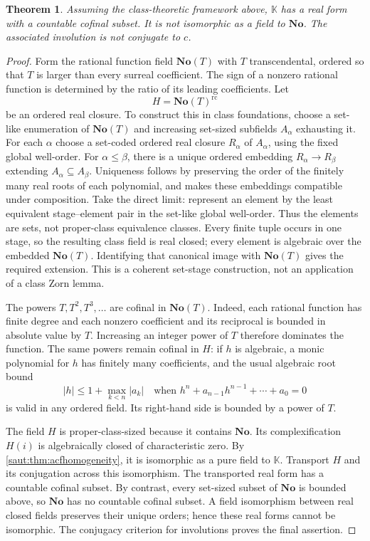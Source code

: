 \documentclass[11pt]{article}
\newtheorem{theorem}{Theorem}[section]
\theoremstyle{definition}
\theoremstyle{remark}
\newcommand{\No}{\mathbf{No}}
\newcommand{\K}{\mathbb K}
\newcommand{\rc}{\operatorname{rc}}
\numberwithin{equation}{section}
\begin{document}
\begin{theorem}\label{saut:thm:inequivalentrealform}
Assuming the class-theoretic framework above, $\K$ has a real form with a
countable cofinal subset. It is not isomorphic as a field to $\No$.
The associated involution is not conjugate to $c$.
\end{theorem}
\begin{proof}
Form the rational function field $\No(T)$ with $T$ transcendental, ordered
so that $T$ is larger than every surreal coefficient. The sign of a
nonzero rational function is determined by the ratio of its leading
coefficients. Let
\[
 H=\No(T)^{\rc}
\]
be an ordered real closure. To construct this in class foundations,
choose a set-like enumeration of $\No(T)$ and increasing set-sized subfields
$A_\alpha$ exhausting it. For each $\alpha$ choose a set-coded ordered real
closure $R_\alpha$ of $A_\alpha$, using the fixed global well-order.
For $\alpha\le\beta$, there is a unique ordered embedding
$R_\alpha\to R_\beta$ extending $A_\alpha\subseteq A_\beta$.
Uniqueness follows by preserving the order of the finitely many real roots
of each polynomial, and makes these embeddings compatible under composition.
Take the direct limit: represent an element by the least equivalent
stage--element pair in the set-like global well-order. Thus the elements
are sets, not proper-class equivalence classes. Every finite tuple occurs
in one stage, so the resulting class field is real closed; every element
is algebraic over the embedded $\No(T)$. Identifying that canonical image
with $\No(T)$ gives the required extension. This is a coherent set-stage
construction, not an application of a class Zorn lemma.

The powers $T,T^2,T^3,\ldots$ are cofinal in $\No(T)$. Indeed, each rational
function has finite degree and each nonzero coefficient and its reciprocal
is bounded in absolute value by $T$. Increasing an integer power of $T$
therefore dominates the function. The same powers remain cofinal in $H$:
if $h$ is algebraic, a monic polynomial for $h$ has finitely many
coefficients, and the usual algebraic root bound
\[
 |h|\le 1+\max_{k<n}|a_k|
 \quad\text{when }h^n+a_{n-1}h^{n-1}+\cdots+a_0=0
\]
is valid in any ordered field. Its right-hand side is bounded by a power
of $T$.

The field $H$ is proper-class-sized because it contains $\No$. Its
complexification $H(i)$ is algebraically closed of characteristic zero.
By \cref{saut:thm:acfhomogeneity}, it is isomorphic as a pure field to $\K$.
Transport $H$ and its conjugation across this isomorphism.
The transported real form has a countable cofinal subset. By contrast,
every set-sized subset of $\No$ is bounded above, so $\No$ has no countable
cofinal subset. A field isomorphism between real closed fields preserves
their unique orders; hence these real forms cannot be isomorphic.
The conjugacy criterion for involutions proves the final assertion.
\end{proof}
\end{document}
